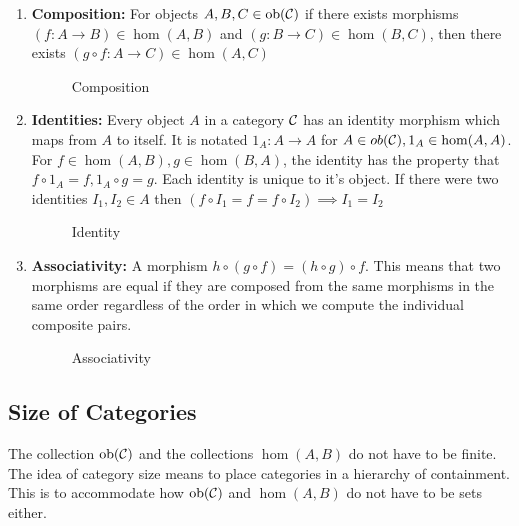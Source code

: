 \documentclass[10pt,a4paper,reqno]{amsart}
\numberwithin{figure}{section}
\begin{document}
\begin{enumerate}
        \item \textbf{Composition:} For objects $A,B,C\in \operatorname{ob}(\mathcal{C})$
        if there exists morphisms $(f: A\to B)\in \hom(A,B)$ and $(g: B\to C)\in
        \hom(B,C)$, then there exists $(g\circ f: A\to C)\in \hom(A,C)$
        \begin{figure}[H]
        \caption{Composition}
        \end{figure}
        \item \textbf{Identities:} Every object $A$ in a category $\mathcal{C}$
        has an identity morphism which maps from $A$ to itself.  It is notated
        $1_A: A\to A$ for $A\in ob(\mathcal{C}), 1_A\in \hom(A,A)$.  For $f\in
        \hom(A,B), g\in \hom(B,A)$, the identity has the property that $f\circ
        1_A = f, 1_A\circ g = g$. Each identity is unique to it's object. If
        there were two identities $I_1,I_2\in A$ then $(f\circ I_1 = f = f\circ
        I_2) \implies I_1=I_2$
        \begin{figure}[H]
        \caption{Identity}
        \end{figure}
        \item \textbf{Associativity:} A morphism $h\circ(g\circ f) = (h\circ
        g)\circ f$. This means that two morphisms are equal if they are
        composed from the same morphisms in the same order regardless of the
        order in which we compute the individual composite pairs.
        \begin{figure}[H]
        \caption{Associativity}
        \end{figure}
\end{enumerate}

\subsection{Size of Categories}
The collection $\operatorname{ob}(\mathcal{C})$ and the collections $\hom(A,B)$ do not have
to be finite. The idea of category size means to place categories in a
hierarchy of containment. This is to accommodate how $\operatorname{ob}(\mathcal{C})$ and
$\hom(A,B)$ do not have to be sets either.
\end{document}
